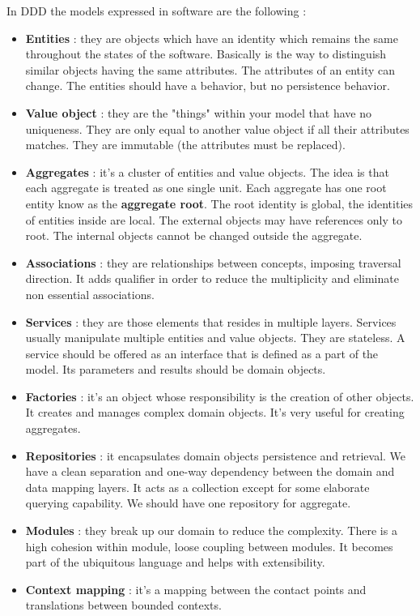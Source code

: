 In DDD the models expressed in software are the following :
\begin{itemize}
    \item \textbf{Entities} : they are objects which have an identity which remains the same throughout the states of the software. Basically is the way to distinguish similar objects having the same attributes. The attributes of an entity can change. The entities should have a behavior, but no persistence behavior.
    \item \textbf{Value object} : they are the "things" within your model that have no uniqueness. They are only equal to another value object if all their attributes matches. They are immutable (the attributes must be replaced).
    \item \textbf{Aggregates} : it's a cluster of entities and value objects. The idea is that each aggregate is treated as one single unit. Each aggregate has one root entity know as the \textbf{aggregate root}. The root identity is global, the identities of entities inside are local. The external objects may have references only to root. The internal objects cannot be changed outside the aggregate.
    \item \textbf{Associations} : they are relationships between concepts, imposing traversal direction. It adds qualifier in order to reduce the multiplicity and eliminate non essential associations.
    \item \textbf{Services} : they are those elements that resides in multiple layers. Services usually manipulate multiple entities and value objects. They are stateless. A service should be offered as an interface that is defined as a part of the model. Its parameters and results should be domain objects.
    \item \textbf{Factories} : it's an object whose responsibility is the creation of other objects. It creates and manages complex domain objects. It's very useful for creating aggregates.
    \item \textbf{Repositories} : it encapsulates domain objects persistence and retrieval. We have a clean separation and one-way dependency between the domain and data mapping layers. It acts as a collection except for some elaborate querying capability. We should have one repository for aggregate.
    \item \textbf{Modules} : they break up our domain to reduce the complexity. There is a high cohesion within module, loose coupling between modules. It becomes part of the ubiquitous language and helps with extensibility.
    \item \textbf{Context mapping} : it's a mapping between the contact points and translations between bounded contexts.
\end{itemize}